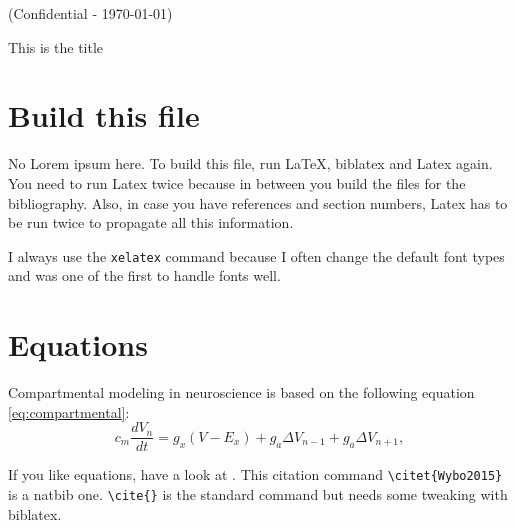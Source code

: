 \documentclass[a4paper]{article}
\def \mydate {Before the deadline}
\def \mydate {\today}
\begin{document}
\noindent(Confidential - \mydate)
\begin{center}
\Large This is the title
\end{center}


\section{Build this file}
No Lorem ipsum here. To build this file, run \LaTeX, biblatex and Latex again. You need to run Latex twice because in between you build the files for the bibliography. Also, in case you have references and section numbers, Latex has to be run twice to propagate all this information.

I always use the \texttt{xelatex} command because I often change the default font types and \XeLaTeX was one of the first to handle fonts well.

\section{Equations}

Compartmental modeling in neuroscience is based on the following equation \ref{eq:compartmental}:
\begin{equation}
\label{eq:compartmental}
c_m \frac{d V_n}{d t} = g_x(V-E_x)+g_a\Delta V_{n-1} + g_a \Delta V_{n+1},
\end{equation}

If you like equations, have a look at \citet{Wybo2015}. This citation command \verb+\citet{Wybo2015}+ is a natbib one. \verb+\cite{}+ is the standard command but needs some tweaking with biblatex.

\printbibliography[title={My custom reference list}]
\end{document}
